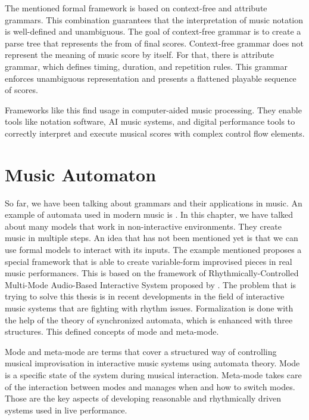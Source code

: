 The mentioned formal framework is based on context-free and attribute grammars. This combination guarantees that the interpretation of music notation is well-defined and unambiguous. The goal of context-free grammar is to create a parse tree that represents the from of final scores. Context-free grammar does not represent the meaning of music score by itself. For that, there is attribute grammar, which defines timing, duration, and repetition rules. This grammar enforces unambiguous representation and presents a flattened playable sequence of scores.

Frameworks like this find usage in computer-aided music processing. They enable tools like notation software, AI music systems, and digital performance tools to correctly interpret and execute musical scores with complex control flow elements.


\section{Music Automaton}
So far, we have been talking about grammars and their applications in music. An example of automata used in modern music is \cite{automataphd}. In this chapter, we have talked about many models that work in non-interactive environments. They create music in multiple steps. An idea that has not been mentioned yet is that we can use formal models to interact with its inputs. The example mentioned proposes a special framework that is able to create variable-form improvised pieces in real music performances. This is based on the framework of Rhythmically-Controlled Multi-Mode Audio-Based Interactive System proposed by \cite{automataphd}. The problem that is trying to solve this thesis is in recent developments in the field of interactive music systems that are fighting with rhythm issues. Formalization is done with the help of the theory of synchronized automata, which is enhanced with three structures. This defined concepts of mode and meta-mode.

Mode and meta-mode are terms that cover a structured way of controlling musical improvisation in interactive music systems using automata theory. Mode is a specific state of the system during musical interaction. Meta-mode takes care of the interaction between modes and manages when and how to switch modes. Those are the key aspects of developing reasonable and rhythmically driven systems used in live performance.


